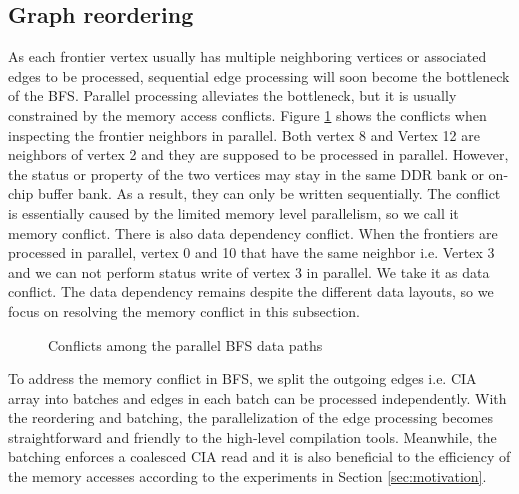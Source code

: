 \subsection{Graph reordering}
As each frontier vertex usually has multiple neighboring 
vertices or associated edges to be processed, sequential edge processing 
will soon become the bottleneck of the BFS. Parallel processing alleviates the bottleneck, 
but it is usually constrained by the memory access conflicts. Figure \ref{fig:write-conflict} 
shows the conflicts when inspecting the frontier neighbors in parallel.  
Both vertex 8 and Vertex 12 are neighbors of vertex 2 and they are supposed to be 
processed in parallel. However, the status or property of 
the two vertices may stay in the same DDR bank or on-chip buffer bank. As a result, 
they can only be written sequentially. The conflict is essentially caused by the 
limited memory level parallelism, so we call it memory conflict. 
There is also data dependency conflict. When the frontiers are processed in parallel, 
vertex 0 and 10 that have the same neighbor i.e. Vertex 3 and we can not perform status 
write of vertex 3 in parallel. We take it as data conflict. 
The data dependency remains despite the different data layouts, 
so we focus on resolving the memory conflict in this subsection.   

\begin{figure}
    \caption{Conflicts among the parallel BFS data paths}
\label{fig:write-conflict}
\vspace{-0.5em}
\end{figure}

To address the memory conflict in BFS, we split the outgoing edges i.e. CIA array 
into batches and edges in each batch can be processed independently.
With the reordering and batching, the parallelization of the edge processing 
becomes straightforward and friendly to the high-level compilation tools.
Meanwhile, the batching enforces a coalesced CIA read and it is also beneficial to 
the efficiency of the memory accesses according to the experiments in Section \ref{sec:motivation}. 

